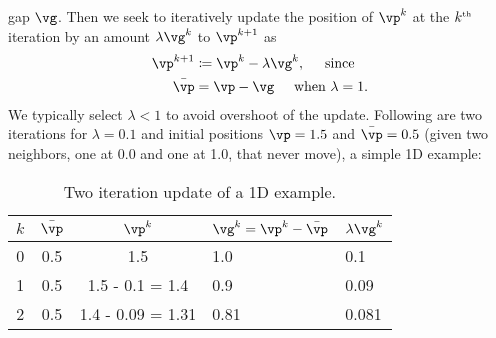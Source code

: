 \documentclass[11pt, oneside]{article}   	%
\begin{document}
gap $\vg$.  Then we seek to iteratively update the position of $\vp^k$ at the
$k^{\mbox{\tiny th}}$ iteration by an amount $\lambda \vg^k$ to $\vp^{k+1}$ as
\begin{align}
  \vp^{k+1} & \coloneqq \vp^k - \lambda \vg^k, \hspace{0.5cm} \mbox{since} \\
  \bar{\vp} & = \vp - \vg \hspace{0.5cm} \mbox{when } \lambda = 1.
\end{align}
We typically select $\lambda < 1$ to avoid overshoot of the update.  Following
are two iterations for $\lambda = 0.1$ and initial positions $\vp = 1.5$ and
$\bar{\vp} = 0.5$ (given two neighbors, one at 0.0 and one at 1.0, that 
never move), a simple 1D example:

\begin{table}[htb]
  \caption{Two iteration update of a 1D example.}
  \label{tab:update_example} %
  \centering
  \begin{tabular}{c|c|c|l|l}
    $k$ & $\bar{\vp}$ & $\vp^k$ & $\vg^k = \vp^k - \bar{\vp}$ & $\lambda \vg^k$ \\
   \hline
   \hline
   0 & 0.5 & 1.5 & 1.0 & 0.1 \\
   1 & 0.5 & 1.5 - 0.1 = 1.4 & 0.9 & 0.09 \\
   2 & 0.5 & 1.4 - 0.09 = 1.31 & 0.81 & 0.081
  \end{tabular}
\end{table}


% 
%     
% 
% 
\end{document}
